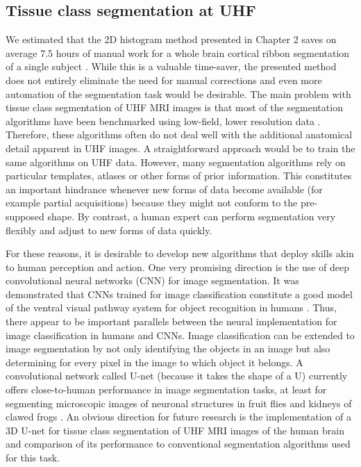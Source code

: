 \subsection{Tissue class segmentation at UHF}
We estimated that the 2D histogram method presented in Chapter 2 saves on average 7.5 hours of manual work for a whole brain cortical ribbon segmentation of a single subject \parencite{Gulban2018a}. While this is a valuable time-saver, the presented method does not entirely eliminate the need for manual corrections and even more automation of the segmentation task would be desirable. The main problem with tissue class segmentation of UHF MRI images is that most of the segmentation algorithms have been benchmarked using low-field, lower resolution data \parencite{Helms2016}. Therefore, these algorithms often do not deal well with the additional anatomical detail apparent in UHF images. A straightforward approach would be to train the same algorithms on UHF data. However, many segmentation algorithms \parencite{Ashburner2005, Bazin2014} rely on particular templates, atlases or other forms of prior information. This constitutes an important hindrance whenever new forms of data become available (for example partial acquisitions) because they might not conform to the pre-supposed shape. By contrast, a human expert can perform segmentation very flexibly and adjust to new forms of data quickly.

For these reasons, it is desirable to develop new algorithms that deploy skills akin to human perception and action. One very promising direction is the use of deep convolutional neural networks (CNN) for image segmentation. It was demonstrated that CNNs trained for image classification constitute a good model of the ventral visual pathway system for object recognition in humans \parencite{Kriegeskorte2014, Yamins2016}. Thus, there appear to be important parallels between the neural implementation for image classification in humans and CNNs. Image classification can be extended to image segmentation by not only identifying the objects in an image but also determining for every pixel in the image to which object it belongs. A convolutional network called U-net (because it takes the shape of a U) currently offers close-to-human performance in image segmentation tasks, at least for segmenting microscopic images of neuronal structures in fruit flies \parencite{Ronneberger2015} and kidneys of clawed frogs \parencite{Cicek2016}. An obvious direction for future research is the implementation of a 3D U-net for tissue class segmentation of UHF MRI images of the human brain and comparison of its performance to conventional segmentation algorithms used for this task.


